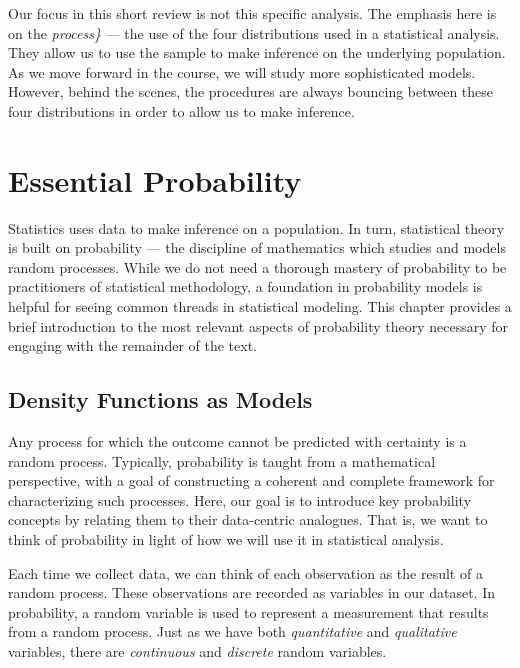 \documentclass[
]{book}
\theoremstyle{plain}
\theoremstyle{mydefn}
\theoremstyle{myexmpl}
\theoremstyle{remark}
\begin{document}
Our focus in this short review is not this specific analysis. The emphasis here is on the \emph{process\}} --- the use of the four distributions used in a statistical analysis. They allow us to use the sample to make inference on the underlying population. As we move forward in the course, we will study more sophisticated models. However, behind the scenes, the procedures are always bouncing between these four distributions in order to allow us to make inference.

\hypertarget{essential-probability}{%
\chapter{Essential Probability}\label{essential-probability}}

Statistics uses data to make inference on a population. In turn, statistical theory is built on probability --- the discipline of mathematics which studies and models random processes. While we do not need a thorough mastery of probability to be practitioners of statistical methodology, a foundation in probability models is helpful for seeing common threads in statistical modeling. This chapter provides a brief introduction to the most relevant aspects of probability theory necessary for engaging with the remainder of the text.

\hypertarget{density-functions-as-models}{%
\section{Density Functions as Models}\label{density-functions-as-models}}

Any process for which the outcome cannot be predicted with certainty is a random process. Typically, probability is taught from a mathematical perspective, with a goal of constructing a coherent and complete framework for characterizing such processes. Here, our goal is to introduce key probability concepts by relating them to their data-centric analogues. That is, we want to think of probability in light of how we will use it in statistical analysis.

Each time we collect data, we can think of each observation as the result of a random process. These observations are recorded as variables in our dataset. In probability, a random variable is used to represent a measurement that results from a random process. Just as we have both \emph{quantitative} and \emph{qualitative} variables, there are \emph{continuous} and \emph{discrete} random variables.
\end{document}
